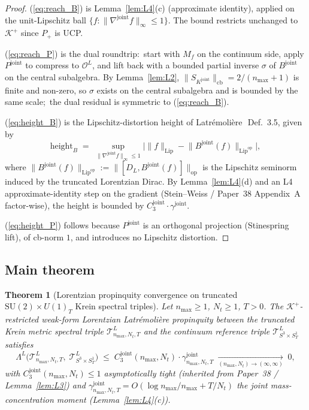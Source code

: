 \documentclass[11pt,a4paper]{article}
\theoremstyle{plain}
\newtheorem{theorem}{Theorem}[section]
\theoremstyle{definition}
\newcommand{\nmax}{n_{\max}}
\newcommand{\Nt}{N_{t}}
\newcommand{\Manifold}{S^{3}\times S^{1}_{T}}
\newcommand{\Krein}{\mathcal{K}}
\newcommand{\Op}{\mathcal{O}}
\newcommand{\Tcal}{\mathcal{T}}
\newcommand{\opnorm}[1]{\lVert #1 \rVert_{\mathrm{op}}}
\newcommand{\cbnorm}[1]{\lVert #1 \rVert_{\mathrm{cb}}}
\newcommand{\norm}[1]{\lVert #1 \rVert}
\newcommand{\SU}{\mathrm{SU}}
\newcommand{\Uone}{U(1)}
\newcommand{\DL}{D_{L}}
\newcommand{\Lprop}{\Lambda^{L}}
\newcommand{\Bjoint}{B^{\mathrm{joint}}}
\newcommand{\Pjoint}{P^{\mathrm{joint}}}
\newcommand{\Kjoint}{K^{\mathrm{joint}}}
\newcommand{\gammajoint}{\gamma^{\mathrm{joint}}}
\newcommand{\Cthreejoint}{C_{3}^{\mathrm{joint}}}
\newcommand{\Kplus}{\Krein^{+}}
\newcommand{\Pplus}{P_{+}}
\begin{document}
\begin{proof}
(\ref{eq:reach_B}) is Lemma~\ref{lem:L4}(c) (approximate identity), applied
on the unit-Lipschitz ball $\{f : \norm{\nabla^{\mathrm{joint}} f}_{\infty}
\le 1\}$. The bound restricts unchanged to $\Kplus$ since $\Pplus$ is
UCP.

(\ref{eq:reach_P}) is the dual roundtrip:\ start with $M_{f}$ on the
continuum side, apply $\Pjoint$ to compress to $\Op^{L}$, and lift back
with a bounded partial inverse $\sigma$ of $\Bjoint$ on the central
subalgebra. By Lemma~\ref{lem:L2}, $\cbnorm{S_{\Kjoint}} =
2/(\nmax + 1)$ is finite and non-zero, so $\sigma$ exists on the
central subalgebra and is bounded by the same scale;\ the dual residual
is symmetric to (\ref{eq:reach_B}).

(\ref{eq:height_B}) is the Lipschitz-distortion height of
Latr\'emoli\`ere~\cite{latremoliere_metric_st_2017}\,Def.~3.5, given
by
\begin{equation*}
   \mathrm{height}_{B}
   \;=\; \sup_{\norm{\nabla^{\mathrm{joint}} f}_{\infty} \le 1}
        \bigl|\norm{f}_{\mathrm{Lip}} - \norm{\Bjoint(f)}_{\mathrm{Lip}^{\mathrm{op}}}\bigr|,
\end{equation*}
where $\norm{\Bjoint(f)}_{\mathrm{Lip}^{\mathrm{op}}} :=
\opnorm{[\DL, \Bjoint(f)]}$ is the Lipschitz seminorm induced by the
truncated Lorentzian Dirac. By Lemma~\ref{lem:L4}(d) and an L4
approximate-identity step on the gradient (Stein--Weiss / Paper~38
Appendix~A factor-wise), the height is bounded by $\Cthreejoint \cdot
\gammajoint$.

(\ref{eq:height_P}) follows because $\Pjoint$ is an orthogonal
projection (Stinespring lift), of cb-norm $1$, and introduces no
Lipschitz distortion. \qedhere
\end{proof}

\subsection{Main theorem}\label{sec:main_theorem}

\begin{theorem}[Lorentzian propinquity convergence on truncated
$\SU(2) \times \Uone_{T}$ Krein spectral triples]\label{thm:main}
Let $\nmax \ge 1$, $\Nt \ge 1$, $T > 0$. The $\Kplus$-restricted
weak-form Lorentzian Latr\'emoli\`ere propinquity between the truncated
Krein metric spectral triple $\Tcal^{L}_{\nmax,\Nt,T}$ and the
continuum reference triple $\Tcal^{L}_{\Manifold}$ satisfies
\begin{equation}\label{eq:main_bound}
   \Lprop\!\bigl(\Tcal^{L}_{\nmax,\Nt,T},\;
                 \Tcal^{L}_{\Manifold}\bigr)
   \;\le\; \Cthreejoint(\nmax, \Nt) \cdot \gammajoint_{\nmax, \Nt, T}
   \;\xrightarrow[(\nmax, \Nt)\to(\infty, \infty)]{}\; 0,
\end{equation}
with $\Cthreejoint(\nmax, \Nt) \le 1$ asymptotically tight (inherited
from Paper~38 / Lemma~\ref{lem:L3}) and $\gammajoint_{\nmax, \Nt, T}
= O(\log\nmax/\nmax + T/\Nt)$ the joint mass-concentration moment
(Lemma~\ref{lem:L4}(c)).
\end{theorem}
\end{document}
